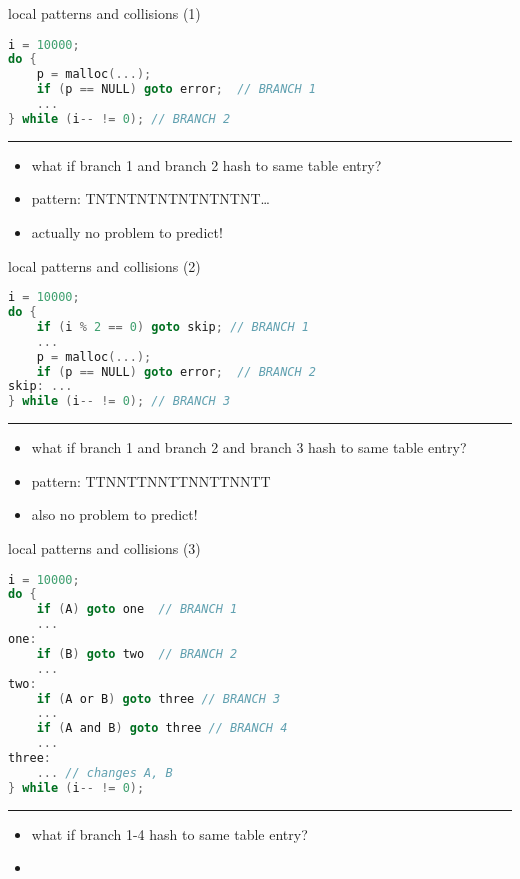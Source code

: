 \begin{frame}[fragile,label=localAndCollision1]{local patterns and collisions (1)}
\begin{lstlisting}[language=C,style=small]
i = 10000;
do {
    p = malloc(...);
    if (p == NULL) goto error;  // BRANCH 1
    ...
} while (i-- != 0); // BRANCH 2
\end{lstlisting}
\hrule
\begin{itemize}
\item what if branch 1 and branch 2 hash to same table entry?
\item<2-> pattern: TNTNTNTNTNTNTNTNT\ldots
\item<2-> actually no problem to predict!
\end{itemize}
\end{frame}

\begin{frame}[fragile,label=localAndCollision2]{local patterns and collisions (2)}
\begin{lstlisting}[language=C,style=small]
i = 10000;
do {
    if (i % 2 == 0) goto skip; // BRANCH 1
    ...
    p = malloc(...);
    if (p == NULL) goto error;  // BRANCH 2
skip: ...
} while (i-- != 0); // BRANCH 3
\end{lstlisting}
\hrule
\begin{itemize}
\item what if branch 1 and branch 2 and branch 3 hash to same table entry?
\item<2-> pattern: TTNNTTNNTTNNTTNNTT
\item<2-> also no problem to predict!
\end{itemize}
\end{frame}

\begin{frame}[fragile,label=localAndCollision3]{local patterns and collisions (3)}
\begin{lstlisting}[language=C,style=smaller]
i = 10000;
do {
    if (A) goto one  // BRANCH 1
    ...
one:
    if (B) goto two  // BRANCH 2
    ...
two:
    if (A or B) goto three // BRANCH 3
    ...
    if (A and B) goto three // BRANCH 4
    ...
three:
    ... // changes A, B
} while (i-- != 0); 
\end{lstlisting}
\hrule
\begin{itemize}
\item what if branch 1-4 hash to same table entry?
\item {}
\end{itemize}
\end{frame}
